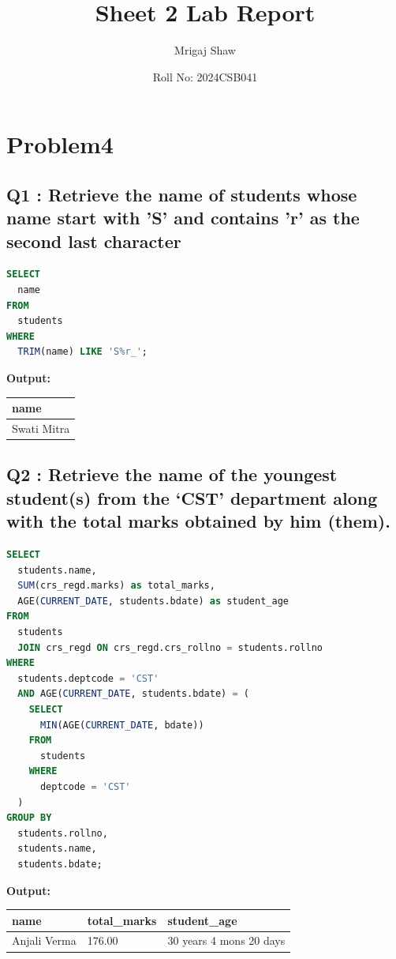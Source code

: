 \documentclass[11pt, a4paper]{article}
\title{Sheet 2 Lab Report}
\author{Mrigaj Shaw}
\date{Roll No: 2024CSB041}
\begin{document}
\maketitle

\section{Problem4}
\subsection*{Q1 : Retrieve the name of students whose name start with 'S' and contains 'r' as the second last character}
\begin{lstlisting}[language=SQL]
SELECT
  name
FROM
  students
WHERE
  TRIM(name) LIKE 'S%r_';
\end{lstlisting}
\vspace{0.3cm}
\textbf{Output:}\vspace{0.2cm}
\begin{center}
\begin{tabular}{|l|}
\hline
\textbf{name} \\ \hline
Swati Mitra                    \\ \hline
\end{tabular}
\end{center}
\newpage
\subsection*{Q2 : Retrieve the name of the youngest student(s) from the ‘CST’ department along with the total marks obtained by him (them).}
\begin{lstlisting}[language=SQL]
SELECT
  students.name,
  SUM(crs_regd.marks) as total_marks,
  AGE(CURRENT_DATE, students.bdate) as student_age
FROM
  students
  JOIN crs_regd ON crs_regd.crs_rollno = students.rollno
WHERE
  students.deptcode = 'CST'
  AND AGE(CURRENT_DATE, students.bdate) = (
    SELECT
      MIN(AGE(CURRENT_DATE, bdate))
    FROM
      students
    WHERE
      deptcode = 'CST'
  )
GROUP BY
  students.rollno,
  students.name,
  students.bdate;
\end{lstlisting}
\vspace{0.3cm}
\textbf{Output:}\vspace{0.2cm}
\begin{center}
\begin{tabular}{|l|l|l|}
\hline
\textbf{name} & \textbf{total\_marks} & \textbf{student\_age} \\ \hline
Anjali Verma                   & 176.00 & 30 years 4 mons 20 days \\ \hline
\end{tabular}
\end{center}
\newpage
\end{document}
